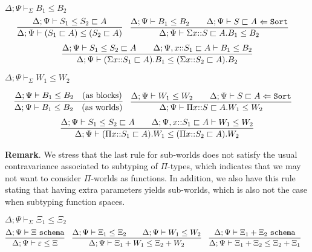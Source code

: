 \documentclass[letterpaper, 11pt]{article}
\newcommand{\Lar}{\Leftarrow}
\newcommand{\Sort}{\texttt{Sort}}
\newcommand{\schema}{\texttt{schema}}
\begin{document}
    $\boxed{\Delta; \Psi \vdash_\Sigma B_1 \leq B_2}$
    \begin{align*}
      & \infer{\Delta; \Psi \vdash (S_1 \sqsubset A) \leq (S_2 \sqsubset A)}
              {
                \Delta; \Psi \vdash S_1 \leq S_2 \sqsubset A
              } &
      & \infer{\Delta; \Psi \vdash \Sigma x{::}S \sqsubset A. B_1 \leq B_2}
              {
                \Delta ; \Psi \vdash B_1 \leq B_2
                &&
                \Delta; \Psi \vdash S \sqsubset A \Lar \Sort
              }
    \end{align*}
    \begin{align*}
      \infer{\Delta; \Psi \vdash (\Sigma x{::} S_1 \sqsubset A).B_1 \leq (\Sigma x{::}S_2 \sqsubset A). B_2 }
            {
              \Delta; \Psi \vdash S_1 \leq S_2 \sqsubset A
              &&
              \Delta; \Psi, x{::}S_1 \sqsubset A \vdash B_1 \leq B_2
            }
    \end{align*}

    $\boxed{ \Delta; \Psi \vdash_\Sigma W_1 \leq W_2}$

    \begin{align*}
      & \infer{\Delta; \Psi \vdash B_1 \leq B_2 \quad (\text{as worlds})}
              {
                \Delta; \Psi \vdash B_1 \leq B_2 \quad ( \text{as blocks})
              } &
      & \infer{\Delta; \Psi \vdash \Pi x{::}S \sqsubset A. W_1 \leq W_2}
              {
                \Delta ; \Psi \vdash W_1 \leq W_2
                &&
                \Delta; \Psi \vdash S \sqsubset A \Lar \Sort
              }
    \end{align*}
    \begin{align*}
      \infer{\Delta; \Psi \vdash (\Pi x{::} S_1 \sqsubset A).W_1 \leq (\Pi x{::}S_2 \sqsubset A). W_2 }
            {
              \Delta; \Psi \vdash S_1 \leq S_2 \sqsubset A
              &&
              \Delta; \Psi, x{::}S_1 \sqsubset A \vdash W_1 \leq W_2
            }
    \end{align*}

    \textbf{Remark}.  We stress that the last rule for sub-worlds does not satisfy the usual contravariance associated to subtyping of $\Pi$-types, which
    indicates that we may not want to consider $\Pi$-worlds as functions.  In addition, we also have this rule stating that having extra parameters yields
    sub-worlds, which is also not the case when subtyping function spaces.
    
    $\boxed{ \Delta; \Psi \vdash_\Sigma \Xi_1 \leq \Xi_2}$
    \begin{align*}
      & \infer{\Delta; \Psi \vdash \varepsilon \leq \Xi}{\Delta; \Psi \vdash \Xi \ \schema} &
      & \infer{\Delta; \Psi \vdash \Xi_1 + W_1 \leq \Xi_2 + W_2}
        {
          \Delta; \Psi \vdash \Xi_1 \leq \Xi_2
          &&
          \Delta; \Psi \vdash W_1 \leq W_2
        } &
      & \infer{\Delta; \Psi \vdash \Xi_1 + \Xi_2 \leq \Xi_2 + \Xi_1}{\Delta; \Psi \vdash \Xi_1 + \Xi_2 \ \schema}
    \end{align*}
\end{document}
